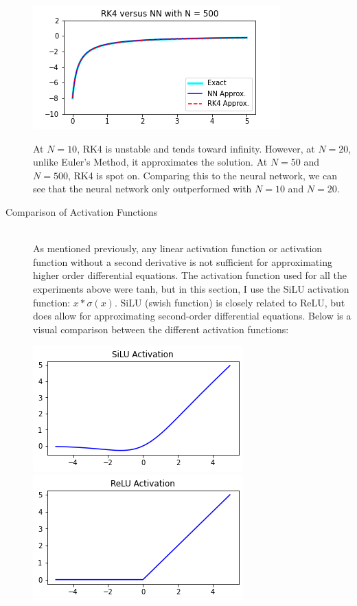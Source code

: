 \documentclass[12pt]{article}
\begin{document}
\begin{description}
\begin{minipage}{\linewidth}
        \includegraphics[scale=.5]{images/rk500.png}
    \end{minipage}
    At $N=10$, RK4 is unstable and tends toward infinity. However, at $N=20$,
    unlike Euler's Method, it approximates the solution. At $N=50$ and $N=500$,
    RK4 is spot on. Comparing this to the neural network, we can see that the
    neural network only outperformed with $N=10$ and $N=20$.
    \item[Comparison of Activation Functions] \hfill \\ 
    As mentioned previously, any linear activation function or activation
    function without a second derivative is not sufficient for approximating
    higher order differential equations. The activation function used for all
    the experiments above were tanh, but in this section, I use the SiLU
    activation function: $x * \sigma(x)$. SiLU (swish function) is closely
    related to ReLU, but does allow for approximating second-order differential
    equations. Below is a visual comparison between the different activation
    functions: \\
    \begin{minipage}{\linewidth}
        \centering
        \includegraphics[scale=.45]{images/silu.png}
        \includegraphics[scale=.45]{images/relu.png}

\end{minipage}
\end{description}
\end{document}
